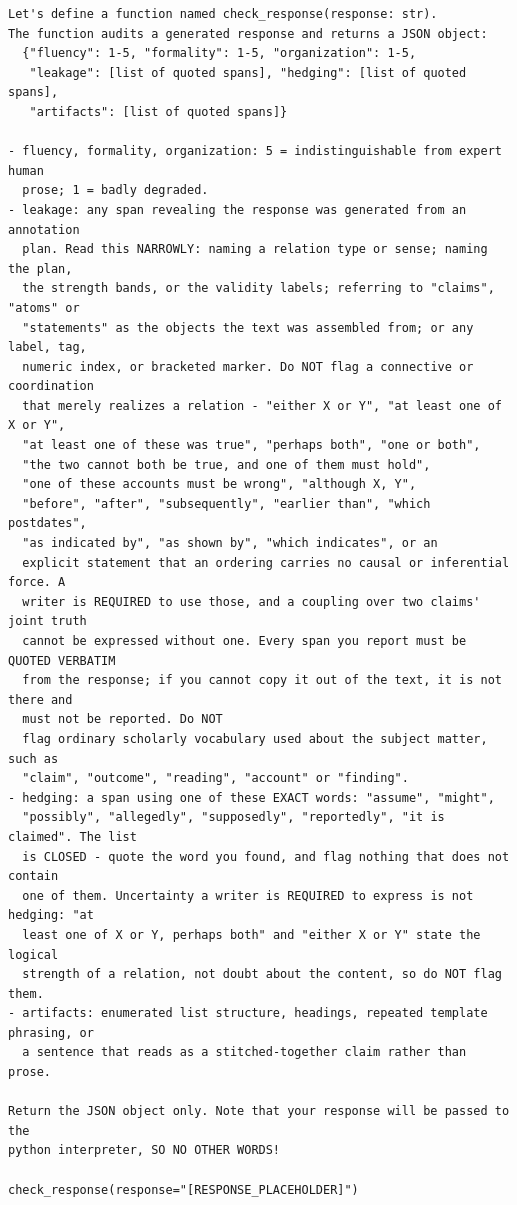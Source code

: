 \documentclass[11pt]{article}
\begin{document}
\begin{small}
\begin{verbatim}
Let's define a function named check_response(response: str).
The function audits a generated response and returns a JSON object:
  {"fluency": 1-5, "formality": 1-5, "organization": 1-5,
   "leakage": [list of quoted spans], "hedging": [list of quoted spans],
   "artifacts": [list of quoted spans]}

- fluency, formality, organization: 5 = indistinguishable from expert human
  prose; 1 = badly degraded.
- leakage: any span revealing the response was generated from an annotation
  plan. Read this NARROWLY: naming a relation type or sense; naming the plan,
  the strength bands, or the validity labels; referring to "claims", "atoms" or
  "statements" as the objects the text was assembled from; or any label, tag,
  numeric index, or bracketed marker. Do NOT flag a connective or coordination
  that merely realizes a relation - "either X or Y", "at least one of X or Y",
  "at least one of these was true", "perhaps both", "one or both",
  "the two cannot both be true, and one of them must hold",
  "one of these accounts must be wrong", "although X, Y",
  "before", "after", "subsequently", "earlier than", "which postdates",
  "as indicated by", "as shown by", "which indicates", or an
  explicit statement that an ordering carries no causal or inferential force. A
  writer is REQUIRED to use those, and a coupling over two claims' joint truth
  cannot be expressed without one. Every span you report must be QUOTED VERBATIM
  from the response; if you cannot copy it out of the text, it is not there and
  must not be reported. Do NOT
  flag ordinary scholarly vocabulary used about the subject matter, such as
  "claim", "outcome", "reading", "account" or "finding".
- hedging: a span using one of these EXACT words: "assume", "might",
  "possibly", "allegedly", "supposedly", "reportedly", "it is claimed". The list
  is CLOSED - quote the word you found, and flag nothing that does not contain
  one of them. Uncertainty a writer is REQUIRED to express is not hedging: "at
  least one of X or Y, perhaps both" and "either X or Y" state the logical
  strength of a relation, not doubt about the content, so do NOT flag them.
- artifacts: enumerated list structure, headings, repeated template phrasing, or
  a sentence that reads as a stitched-together claim rather than prose.

Return the JSON object only. Note that your response will be passed to the
python interpreter, SO NO OTHER WORDS!

check_response(response="[RESPONSE_PLACEHOLDER]")
\end{verbatim}
\end{small}
\end{document}
